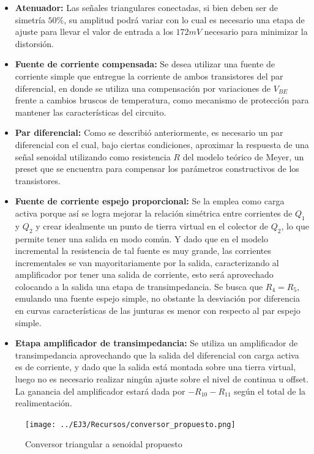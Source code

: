 \begin{itemize}
    \item \textbf{Atenuador:} Las se\~nales triangulares conectadas, si bien deben ser de simetr\'ia $50\%$, su amplitud podr\'a variar con lo cual es necesario una etapa de ajuste para 
    llevar el valor de entrada a los $172mV$ necesario para minimizar la distorsi\'on.
    \item \textbf{Fuente de corriente compensada:} Se desea utilizar una fuente de corriente simple que entregue la corriente de ambos transistores del par diferencial, en donde se utiliza una compensaci\'on
    por variaciones de $V_{BE}$ frente a cambios bruscos de temperatura, como mecanismo de protecci\'on para mantener las caracter\'isticas del circuito.
    \item \textbf{Par diferencial:} Como se describi\'o anteriormente, es necesario un par diferencial con el cual, bajo ciertas condiciones, aproximar la respuesta de una se\~nal senoidal utilizando como resistencia $R$
    del modelo te\'orico de Meyer, un preset que se encuentra para compensar los par\'ametros constructivos de los transistores.
    \item \textbf{Fuente de corriente espejo proporcional:} Se la emplea como carga activa porque as\'i se logra mejorar la relaci\'on sim\'etrica entre corrientes de $Q_1$ y $Q_2$ y crear idealmente un punto de tierra virtual en el colector de $Q_2$,
    lo que permite tener una salida en modo com\'un. Y dado que en el modelo incremental la resistencia de tal fuente es muy grande, las corrientes incrementales se van mayoritariamente por la salida, caracterizando al amplificador
    por tener una salida de corriente, esto ser\'a aprovechado colocando a la salida una etapa de transimpedancia. Se busca que $R_4 = R_5$, emulando una fuente espejo simple, no obstante la desviaci\'on por diferencia en curvas caracter\'isticas de las junturas
    es menor con respecto al par espejo simple.
    \item \textbf{Etapa amplificador de transimpedancia:} Se utiliza un amplificador de transimpedancia aprovechando que la salida del diferencial con carga activa es de corriente, y dado que la salida est\'a montada sobre una tierra virtual,
    luego no es necesario realizar ning\'un ajuste sobre el nivel de continua u offset. La ganancia del amplificador estar\'a dada por $-R_{10} - R_{11}$ seg\'un el total de la realimentaci\'on.
\end{itemize}

\begin{figure}[H]
    \centering
    \texttt{[image: ../EJ3/Recursos/conversor\_propuesto.png]}
    \caption{Conversor triangular a senoidal propuesto}
    \label{fig:circuito_conversor_propuesto}
\end{figure}

